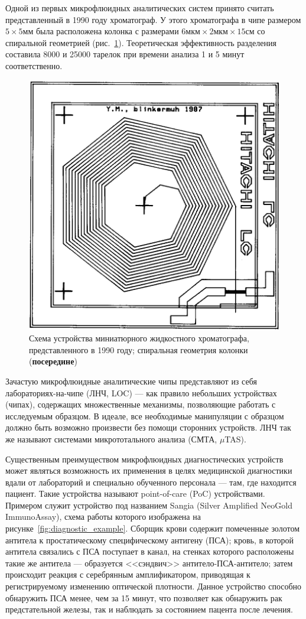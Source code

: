 \documentclass[oneside,final,12pt]{extreport}
\begin{document}
Одной из первых микрофлюидных аналитических систем принято считать
представленный в 1990 году хроматограф\cite{bib:early_chromatograph}.
У этого хроматографа в чипе размером $5\times5\text{мм}$ была
расположена
колонка с размерами
$6\text{мкм} \times 2\text{мкм} \times 15\text{см}$
со спиральной геометрией (рис.~\ref{fig:miniature_chromatograph_scheme}).
Теоретическая эффективность разделения составила 8000 и 25000 тарелок
при времени анализа 1 и 5 минут соответственно.

\begin{figure}
  \centering
  \includegraphics[width=.5\textwidth]{pic/miniature_chromatograph_scheme}

  \caption{%
    \label{fig:miniature_chromatograph_scheme}%
    Схема устройства миниатюрного жидкостного хроматографа, представленного в 1990 году;
    спиральная геометрия колонки (\textbf{посередине})
  }

\end{figure}

Зачастую микрофлюидные аналитические чипы представляют из себя
лабораториях-на-чипе (ЛНЧ, LOC) ---
как правило небольших устройствах (чипах), содержащих
множественные механизмы, позволяющие работать с исследуемым образцом.
В идеале, все необходимые манипуляции с образцом должно быть возможно произвести
без помощи сторонних устройств.
ЛНЧ так же называют системами микрототального анализа (СМТА, $\mu$TAS).

Существенным преимуществом микрофлюидных диагностических устройств
может являться возможность их применения в целях медицинской диагностики
вдали от лабораторий и специально обученного персонала --- там,
где находится пациент.
Такие устройства называют point-of-care (PoC) устройствами\cite{bib:PoC_trends}.
Примером служит устройство под названием
Sangia (Silver Amplified NeoGold ImmunoAssay)\cite{bib:poc_rsa},
схема работы которого изображена на рисунке~\ref{fig:diagnostic_example}.
Сборщик крови содержит помеченные золотом антитела
к простатическому специфическому антигену (ПСА);
кровь, в которой антитела связались с ПСА поступает в канал,
на стенках которого расположены такие же антитела ---
образуется <<сэндвич>> антитело-ПСА-антитело;
затем происходит реакция с серебрянным амплификатором,
приводящая к регистрируемому изменению оптической плотности.
Данное устройство способно обнаружить ПСА менее, чем за 15 минут,
что позволяет как обнаружить рак предстательной железы,
так и наблюдать за состоянием пацента после лечения.
\end{document}
